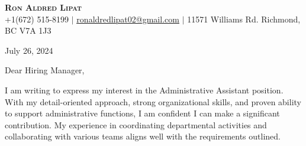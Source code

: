 \documentclass[letterpaper,11pt]{article}
\begin{document}
\begin{center}
\textbf{\Huge \scshape Ron Aldred Lipat} \\ \vspace{1pt}
\small +1(672) 515-8199 $|$ \href{mailto:ronaldredlipat02@gmail.com}{\underline{ronaldredlipat02@gmail.com}} $|$
11571 Williams Rd. Richmond, BC V7A 1J3
\end{center}

\vspace{20pt}
July 26, 2024

\vspace{20pt}

Dear Hiring Manager, \\
\vspace{10pt}

I am writing to express my interest in the Administrative Assistant position. With my detail-oriented approach, strong organizational skills, and proven ability to support administrative functions, I am confident I can make a significant contribution. My experience in coordinating departmental activities and collaborating with various teams aligns well with the requirements outlined.
\vspace{10pt}
\end{document}
